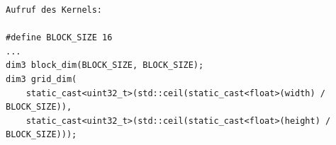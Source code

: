 \documentclass[border=8pt]{standalone}
\begin{document}
    \begin{minipage}{20cm}
        \begin{lstlisting}
Aufruf des Kernels:

#define BLOCK_SIZE 16
...
dim3 block_dim(BLOCK_SIZE, BLOCK_SIZE);
dim3 grid_dim(
    static_cast<uint32_t>(std::ceil(static_cast<float>(width) / BLOCK_SIZE)),
    static_cast<uint32_t>(std::ceil(static_cast<float>(height) / BLOCK_SIZE)));
        \end{lstlisting}
    \end{minipage}
\end{document}
